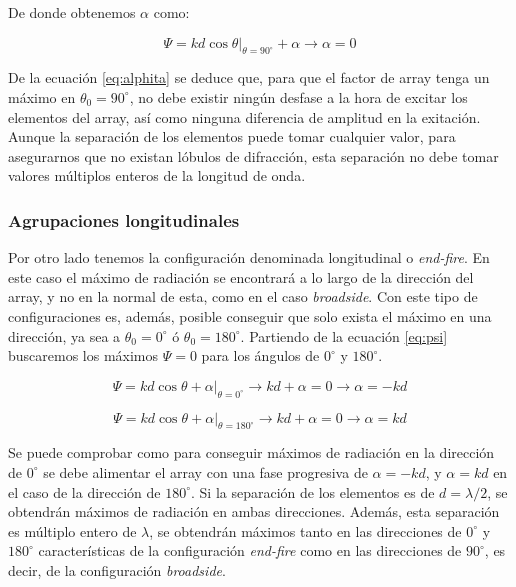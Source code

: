 \par De donde obtenemos $\alpha$ como: 

\begin{equation}
	\Psi=kd\cos\theta|_{\theta=90^{\circ}} +\alpha\rightarrow  \alpha=0
	\label{eq:alphita}
\end{equation}

\par De la ecuación \ref{eq:alphita} se deduce que, para que el factor de array tenga un máximo en $\theta_{0}=90^{\circ}$, no debe existir ningún desfase a la hora de excitar los elementos del array, así como ninguna diferencia de amplitud en la exitación. Aunque la separación de los elementos puede tomar cualquier valor, para asegurarnos que no existan lóbulos de difracción, esta separación no debe tomar valores múltiplos enteros de la longitud de onda. 




\subsubsection{Agrupaciones longitudinales}

\par Por otro lado tenemos la configuración denominada longitudinal o \textit{end-fire}. En este caso el máximo de radiación se encontrará a lo largo de la dirección del array, y no en la normal de esta, como en el caso \textit{broadside}. Con este tipo de configuraciones es, además, posible conseguir que solo exista el máximo en una dirección, ya sea a $\theta_{0}=0^{\circ}$ ó $\theta_{0}=180^{\circ}$. Partiendo de la ecuación \ref{eq:psi} buscaremos los máximos $\Psi=0$ para los ángulos de $0^{\circ}$ y $180^{\circ}$. \cite{Balanis2015}

\begin{equation}
	\Psi = kd\cos\theta+\alpha|_{\theta=0^{\circ}}\rightarrow kd+\alpha=0\rightarrow \alpha=-kd
	\label{eq:end1}
\end{equation}

\begin{equation}
	\Psi = kd\cos\theta+\alpha|_{\theta=180^{\circ}}\rightarrow kd+\alpha=0\rightarrow \alpha=kd
	\label{eq:end2}
\end{equation}

\par Se puede comprobar como para conseguir máximos de radiación en la dirección de $0^{\circ}$ se debe alimentar el array con una fase progresiva de $\alpha=-kd$, y $\alpha=kd$ en el caso de la dirección de $180^{\circ}$. Si la separación de los elementos es de $d=\lambda/2$, se obtendrán máximos de radiación en ambas direcciones. Además, esta separación es múltiplo entero de $\lambda$, se obtendrán máximos tanto en las direcciones de $0^{\circ}$ y $180^{\circ}$ características de la configuración \textit{end-fire} como en las direcciones de
$90^{\circ}$, es decir, de la configuración \textit{broadside}.


